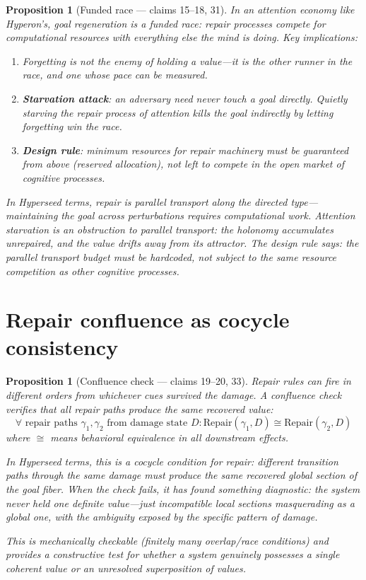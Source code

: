 \documentclass[11pt,a4paper]{article}
\newtheorem{proposition}[definition]{Proposition}
\begin{document}
\begin{proposition}[Funded race --- claims 15--18, 31]
\label{prop:race}
In an attention economy like Hyperon's, goal regeneration is a funded
race: repair processes compete for computational resources with everything
else the mind is doing. Key implications:
\begin{enumerate}
\item Forgetting is not the enemy of holding a value---it is the other
  runner in the race, and one whose pace can be measured.
\item \textbf{Starvation attack}: an adversary need never touch a goal
  directly. Quietly starving the repair process of attention kills the
  goal indirectly by letting forgetting win the race.
\item \textbf{Design rule}: minimum resources for repair machinery must
  be guaranteed from above (reserved allocation), not left to compete
  in the open market of cognitive processes.
\end{enumerate}

In Hyperseed terms, repair is parallel transport along the directed
type---maintaining the goal across perturbations requires computational
work. Attention starvation is an obstruction to parallel transport:
the holonomy accumulates unrepaired, and the value drifts away from its
attractor. The design rule says: the parallel transport budget must be
hardcoded, not subject to the same resource competition as other
cognitive processes.
\end{proposition}


\section{Repair confluence as cocycle consistency}
\label{sec:confluence}

\begin{proposition}[Confluence check --- claims 19--20, 33]
\label{prop:confluence}
Repair rules can fire in different orders from whichever cues survived
the damage. A confluence check verifies that all repair paths produce
the same recovered value:
\[
  \forall \text{ repair paths } \gamma_1, \gamma_2 \text{ from damage state } D :
  \text{Repair}(\gamma_1, D) \cong \text{Repair}(\gamma_2, D)
\]
where $\cong$ means behavioral equivalence in all downstream effects.

In Hyperseed terms, this is a \emph{cocycle condition for repair}:
different transition paths through the same damage must produce the same
recovered global section of the goal fiber. When the check fails, it
has found something diagnostic: the system never held one definite
value---just incompatible local sections masquerading as a global one,
with the ambiguity exposed by the specific pattern of damage.

This is mechanically checkable (finitely many overlap/race conditions)
and provides a constructive test for whether a system genuinely possesses
a single coherent value or an unresolved superposition of values.
\end{proposition}
\end{document}
